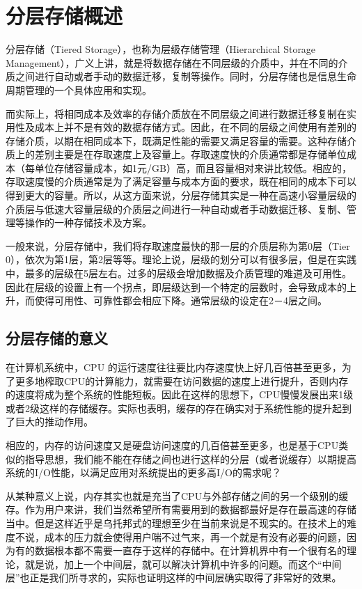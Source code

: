 \chapter{分层存储概述}
分层存储（Tiered Storage），也称为层级存储管理（Hierarchical Storage Management），广义上讲，就是将数据存储在不同层级的介质中，并在不同的介质之间进行自动或者手动的数据迁移，复制等操作。同时，分层存储也是信息生命周期管理的一个具体应用和实现。

而实际上，将相同成本及效率的存储介质放在不同层级之间进行数据迁移复制在实用性及成本上并不是有效的数据存储方式。因此，在不同的层级之间使用有差别的存储介质，以期在相同成本下，既满足性能的需要又满足容量的需要。这种存储介质上的差别主要是在存取速度上及容量上。存取速度快的介质通常都是存储单位成本（每单位存储容量成本，如1元/GB）高，而且容量相对来讲比较低。相应的，存取速度慢的介质通常是为了满足容量与成本方面的要求，既在相同的成本下可以得到更大的容量。所以，从这方面来说，分层存储其实是一种在高速小容量层级的介质层与低速大容量层级的介质层之间进行一种自动或者手动数据迁移、复制、管理等操作的一种存储技术及方案。

一般来说，分层存储中，我们将存取速度最快的那一层的介质层称为第0层（Tier 0），依次为第1层，第2层等等。理论上说，层级的划分可以有很多层，但是在实践中，最多的层级在5层左右。过多的层级会增加数据及介质管理的难道及可用性。因此在层级的设置上有一个拐点，即层级达到一个特定的层数时，会导致成本的上升，而使得可用性、可靠性都会相应下降。通常层级的设定在2－4层之间。

\section{分层存储的意义}
在计算机系统中，CPU 的运行速度往往要比内存速度快上好几百倍甚至更多，为了更多地榨取CPU的计算能力，就需要在访问数据的速度上进行提升，否则内存的速度将成为整个系统的性能短板。因此在这样的思想下，CPU慢慢发展出来1级或者2级这样的存储缓存。实际也表明，缓存的存在确实对于系统性能的提升起到了巨大的推动作用。

相应的，内存的访问速度又是硬盘访问速度的几百倍甚至更多，也是基于CPU类似的指导思想，我们能不能在存储之间也进行这样的分层（或者说缓存）以期提高系统的I/O性能，以满足应用对系统提出的更多高I/O的需求呢？

从某种意义上说，内存其实也就是充当了CPU与外部存储之间的另一个级别的缓存。作为用户来讲，我们当然希望所有需要用到的数据都最好是存在最高速的存储当中。但是这样近乎是乌托邦式的理想至少在当前来说是不现实的。在技术上的难度不说，成本的压力就会使得用户喘不过气来，再一个就是有没有必要的问题，因为有的数据根本都不需要一直存于这样的存储中。在计算机界中有一个很有名的理论，就是说，加上一个中间层，就可以解决计算机中许多的问题。而这个“中间层”也正是我们所寻求的，实际也证明这样的中间层确实取得了非常好的效果。

